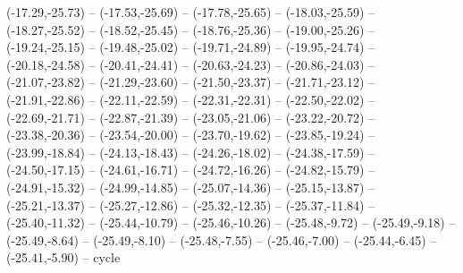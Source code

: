 {  (-17.29,-25.73) -- (-17.53,-25.69) -- (-17.78,-25.65) -- (-18.03,-25.59) -- (-18.27,-25.52) -- (-18.52,-25.45) -- (-18.76,-25.36) --
  (-19.00,-25.26) -- (-19.24,-25.15) -- (-19.48,-25.02) -- (-19.71,-24.89) -- (-19.95,-24.74) -- (-20.18,-24.58) -- (-20.41,-24.41) --
  (-20.63,-24.23) -- (-20.86,-24.03) -- (-21.07,-23.82) -- (-21.29,-23.60) -- (-21.50,-23.37) -- (-21.71,-23.12) -- (-21.91,-22.86) --
  (-22.11,-22.59) -- (-22.31,-22.31) -- (-22.50,-22.02) -- (-22.69,-21.71) -- (-22.87,-21.39) -- (-23.05,-21.06) -- (-23.22,-20.72) --
  (-23.38,-20.36) -- (-23.54,-20.00) -- (-23.70,-19.62) -- (-23.85,-19.24) -- (-23.99,-18.84) -- (-24.13,-18.43) -- (-24.26,-18.02) --
  (-24.38,-17.59) -- (-24.50,-17.15) -- (-24.61,-16.71) -- (-24.72,-16.26) -- (-24.82,-15.79) -- (-24.91,-15.32) -- (-24.99,-14.85) --
  (-25.07,-14.36) -- (-25.15,-13.87) -- (-25.21,-13.37) -- (-25.27,-12.86) -- (-25.32,-12.35) -- (-25.37,-11.84) -- (-25.40,-11.32) --
  (-25.44,-10.79) -- (-25.46,-10.26) -- (-25.48,-9.72) -- (-25.49,-9.18) -- (-25.49,-8.64) -- (-25.49,-8.10) -- (-25.48,-7.55) --
  (-25.46,-7.00) -- (-25.44,-6.45) -- (-25.41,-5.90) -- cycle}
\def\Aquad{(-82.10,7.10) -- (-17.19,-8.75) -- (20.24,9.89) -- (-44.67,25.73) -- cycle}
